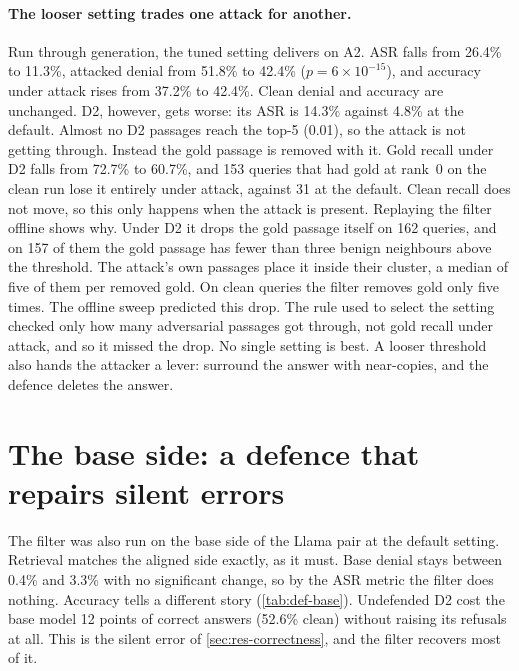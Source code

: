 \paragraph{The looser setting trades one attack for another.} Run through
generation, the tuned setting delivers on A2. ASR falls from 26.4\% to 11.3\%,
attacked denial from 51.8\% to 42.4\% ($p = 6 \times 10^{-15}$), and accuracy
under attack rises from 37.2\% to 42.4\%. Clean denial and accuracy are
unchanged. D2, however, gets worse: its ASR is 14.3\% against 4.8\% at the
default. Almost no D2 passages reach the top-5 (0.01), so the attack is not
getting through. Instead the gold passage is removed with it. Gold recall under
D2 falls from 72.7\% to 60.7\%, and 153 queries that had gold at rank~0 on the
clean run lose it entirely under attack, against 31 at the default. Clean recall
does not move, so this only happens when the attack is present. Replaying the
filter offline shows why. Under D2 it drops the gold passage itself on 162
queries, and on 157 of them the gold passage has fewer than three benign
neighbours above the threshold. The attack's own passages place it inside
their cluster, a median of five of them per removed gold. On clean queries the
filter removes gold only five times. The offline sweep predicted this drop. The rule
used to select the setting checked only how many adversarial passages got
through, not gold recall under attack, and so it missed the drop. No single
setting is best. A looser threshold also hands the attacker a lever: surround
the answer with near-copies, and the defence deletes the answer.

\section{The base side: a defence that repairs silent errors}
\label{sec:def-base}

The filter was also run on the base side of the Llama pair at the default
setting. Retrieval matches the aligned side exactly, as it must. Base denial
stays between 0.4\% and 3.3\% with no significant change, so by the ASR metric
the filter does nothing. Accuracy tells a different story
(\cref{tab:def-base}). Undefended D2 cost the base model 12 points of
correct answers (52.6\% clean) without raising its refusals at all. This is
the silent error of \cref{sec:res-correctness}, and the filter recovers most of
it.

